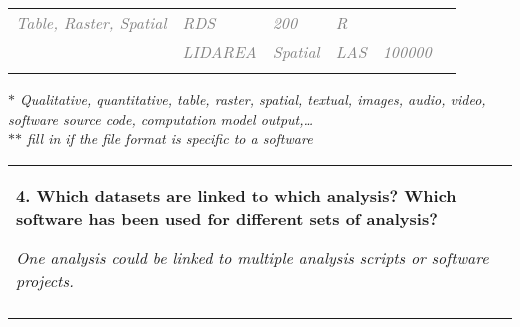 \documentclass[12pt]{article}
\begin{document}
\begin{table}[H]
\begin{tabular}{p{0.20in}p{}p{1.30in}p{0.70in}p{0.50in}p{1.60in}}
\multicolumn{1}{|p{1.30in}|}{\textit{\textcolor[HTML]{808080}{Table, Raster, Spatial}}} & %
\multicolumn{1}{|p{0.70in}|}{\textit{\textcolor[HTML]{808080}{RDS}}} & %
\multicolumn{1}{|p{0.50in}|}{\textit{\textcolor[HTML]{808080}{200}}} & %
\multicolumn{1}{|p{1.60in}|}{\textit{\textcolor[HTML]{808080}{R}}} \\ %
\hhline{------}
\multicolumn{1}{|p{0.20in}}{\textit{\textcolor[HTML]{808080}{D5}}} & %
\multicolumn{1}{|p{0.80in}}{\textit{\textcolor[HTML]{808080}{LIDAREA}}} & %
\multicolumn{1}{|p{1.30in}|}{\textit{\textcolor[HTML]{808080}{Spatial}}} & %
\multicolumn{1}{|p{0.70in}|}{\textit{\textcolor[HTML]{808080}{LAS}}} & %
\multicolumn{1}{|p{0.50in}|}{\textit{\textcolor[HTML]{808080}{100000}}} & %
\multicolumn{1}{|p{1.60in}|}{\textit{\textcolor[HTML]{808080}{}}} \\ %
\hhline{------}
\end{tabular}
\end{table}

\textit{$\ast$ Qualitative, quantitative, table, raster, spatial, textual, images, audio, video, software source code, computation model output,…} \\
\textit{$\ast$$\ast$ fill in if the file format is specific to a software}



\newpage



\begin{table}[H]
 			\centering
\begin{tabular}{p{5.99in}}
\hline
\multicolumn{1}{|p{5.99in}|}{\textbf{4. Which datasets are linked to which analysis? Which software has been used for different sets of analysis?} 
\par \textit{{One analysis could be linked to multiple analysis scripts or software projects.}}} \\
\hhline{-}
\end{tabular}
\end{table}

\end{document}
